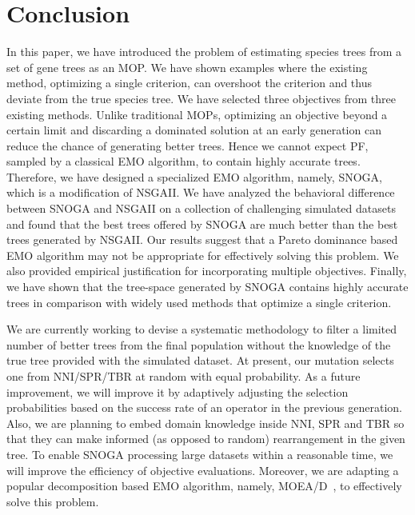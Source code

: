  \section{Conclusion} In this paper, we have introduced the problem of estimating species trees from a set of gene trees as an MOP. We have shown examples where the existing method, optimizing a single criterion, can overshoot the criterion and thus deviate from the true species tree. We have selected three objectives from three existing methods. Unlike traditional MOPs, optimizing an objective beyond a certain limit and discarding a dominated solution at an early generation can reduce the chance of generating better trees. Hence we cannot expect PF, sampled by a classical EMO algorithm, to contain highly accurate trees. Therefore, we have designed a specialized EMO algorithm, namely, SNOGA, which is a modification of NSGAII. We have analyzed the behavioral difference between SNOGA and NSGAII on a collection of challenging simulated datasets and found that the best trees offered by SNOGA are much better than the best trees generated by NSGAII. Our results suggest that a Pareto dominance based EMO algorithm may not be appropriate for effectively solving this problem. We also provided empirical justification for incorporating multiple objectives. Finally, we have shown that the tree-space generated by SNOGA contains highly accurate trees in comparison with widely used methods that optimize a single criterion. 





We are currently working to devise a systematic methodology to filter a limited number of better trees from the final population without the knowledge of the true tree provided with the simulated dataset. At present, our mutation selects one from NNI/SPR/TBR at random with equal probability. As a future improvement, we will improve it by adaptively adjusting the selection probabilities based on the success rate of an operator in the previous generation. Also, we are planning to embed domain knowledge inside NNI, SPR and TBR so that they can make informed (as opposed to random) rearrangement in the given tree. To enable SNOGA processing large datasets within a reasonable time, we will improve the efficiency of objective evaluations. Moreover, we are adapting a popular decomposition based EMO algorithm, namely, MOEA/D~\cite{zhang2007moea}, to effectively solve this problem. 


